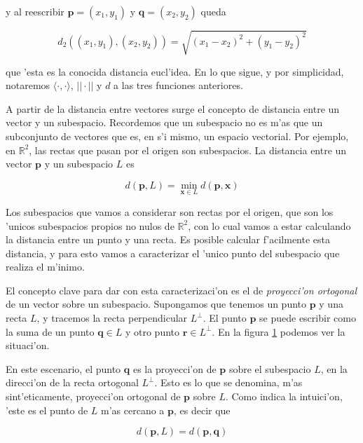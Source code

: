 \noindent
y al reescribir $\mathbf{p} = (x_1, y_1)$ y $\mathbf{q} = (x_2, y_2)$ queda

\[d_2((x_1, y_1), (x_2, y_2)) = \sqrt{(x_1 - x_2)^2 + (y_1 - y_2)^2}\]

\noindent
que 'esta es la conocida distancia eucl'idea. En lo que sigue, y por simplicidad, notaremos $\langle \cdot, \cdot \rangle$, $||\cdot||$ y $d$ a las tres funciones anteriores.

A partir de la distancia entre vectores surge el concepto de distancia entre un vector y un subespacio. Recordemos que un subespacio no es m'as que un subconjunto de vectores que es, en s'i mismo, un espacio vectorial. Por ejemplo, en $\mathbb{R}^2$, las rectas que pasan por el origen son subespacios. La distancia entre un vector $\mathbf{p}$ y un subespacio $L$ es

\[d(\mathbf{p}, L) = \min\limits_{\mathbf{x} \in L} d(\mathbf{p}, \mathbf{x})\]

\noindent
Los subespacios que vamos a considerar son rectas por el origen, que son los 'unicos subespacios propios no nulos de $\mathbb{R}^2$, con lo cual vamos a estar calculando la distancia entre un punto y una recta. Es posible calcular f'acilmente esta distancia, y para esto vamos a caracterizar el 'unico punto del subespacio que realiza el m'inimo.

El concepto clave para dar con esta caracterizaci'on es el de \textit{proyecci'on ortogonal} de un vector sobre un subespacio. Supongamos que tenemos un punto $\mathbf{p}$ y una recta $L$, y tracemos la recta perpendicular $L^{\perp}$. El punto $\mathbf{p}$ se puede escribir como la suma de un punto $\mathbf{q} \in L$ y otro punto $\mathbf{r} \in L^{\perp}$. En la figura \ref{fig3} podemos ver la situaci'on.

\begin{figure}[H]
	\begin{center}
	\end{center}		
	\caption{}
	\label{fig3}
\end{figure}

\noindent
En este escenario, el punto $\mathbf{q}$ es la proyecci'on de $\mathbf{p}$ sobre el subespacio $L$, en la direcci'on de la recta ortogonal $L^{\perp}$. Esto es lo que se denomina, m'as sint'eticamente, proyecci'on ortogonal de $\mathbf{p}$ sobre $L$. Como indica la intuici'on, 'este es el punto de $L$ m'as cercano a $\mathbf{p}$, es decir que

\begin{equation*}
d(\mathbf{p}, L) = d(\mathbf{p}, \mathbf{q})
\label{eq_dist_1}
\end{equation*}

